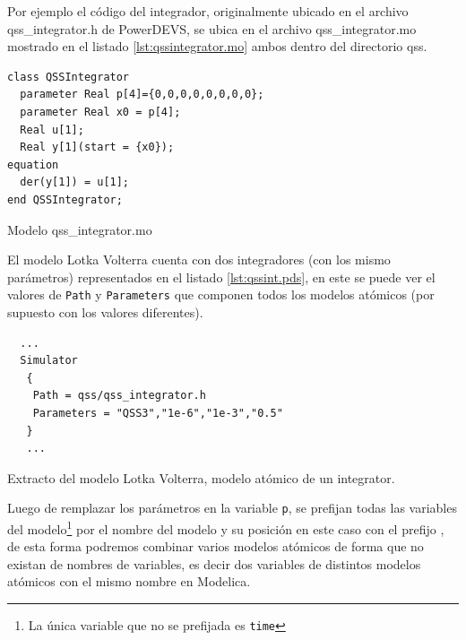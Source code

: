 


        Por ejemplo el código del integrador, originalmente ubicado en el archivo qss\_integrator.h de PowerDEVS, se ubica en el archivo qss\_integrator.mo 
	mostrado en el listado \ref{lst:qssintegrator.mo} ambos dentro del directorio qss.

\begin{listing}[H]
\begin{verbatim}
class QSSIntegrator
  parameter Real p[4]={0,0,0,0,0,0,0,0};
  parameter Real x0 = p[4];
  Real u[1];
  Real y[1](start = {x0});
equation
  der(y[1]) = u[1];
end QSSIntegrator;
\end{verbatim}
\caption{Modelo qss\_integrator.mo}
\label{lst:qssintegrator.mo}
\end{listing}

        El modelo Lotka Volterra cuenta con dos integradores (con los mismo parámetros) representados en el listado \ref{lst:qssint.pds}, en este se puede ver 
        el valores de \texttt{Path} y \texttt{Parameters} que componen todos los modelos atómicos (por supuesto con los valores diferentes).

\begin{listing}[H]
\begin{verbatim}
  ...
  Simulator
   {
    Path = qss/qss_integrator.h
    Parameters = "QSS3","1e-6","1e-3","0.5"
   }
   ...
\end{verbatim}
\label{lst:qssint.pds}
\caption{Extracto del modelo Lotka Volterra, modelo atómico de un integrator.}
\end{listing}

        Luego de remplazar los parámetros en la variable \texttt{p}, se prefijan todas las variables del modelo\footnote{La única variable que no se prefijada 
        es \texttt{time}} por el nombre del modelo y su posición en este caso con el prefijo 
        , de esta forma podremos combinar varios modelos atómicos de forma que no existan  de nombres de variables,
        es decir dos variables de distintos modelos atómicos con el mismo nombre en Modelica. 

